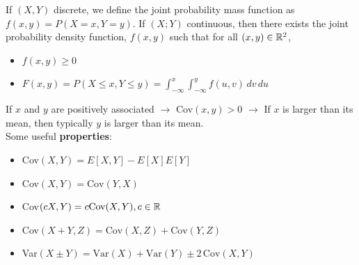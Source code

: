 If $(X,Y)$ discrete, we define the joint probability mass function as $f(x,y) = P(X=x, Y=y)$. 
If $(X;Y)$ continuous, then there exists the joint probability density function, $f(x,y)$
such that for all $(x,y)\in\mathbb{R}^2$,
\begin{itemize}
    \item $f(x,y)\geq 0$
    \item $F(x,y)=P(X\leq x, Y\leq y) = \int_{-\infty}^{x}\int_{-\infty}^{y}f(u,v)\, dv\, du$
\end{itemize}
If $x$ and $y$ are positively associated $\rightarrow$ Cov$(x,y)>0$ $\rightarrow$ If $x$ is larger than its mean, then typically $y$ is larger than its mean.\\

Some useful \textbf{properties}:
\begin{itemize}
    \item Cov$(X,Y) = E[X,Y] - E[X]E[Y]$
    \item Cov$(X,Y) = \text{Cov}(Y,X)$
    \item Cov$(cX,Y) = c\text{Cov}(X,Y), c\in\mathbb{R}$
    \item Cov$(X+Y, Z) = \text{Cov}(X,Z)+\text{Cov}(Y,Z)$
    \item Var$(X\pm Y) = \text{Var}(X)+\text{Var}(Y)\pm 2\,\text{Cov}(X,Y)$
\end{itemize}

